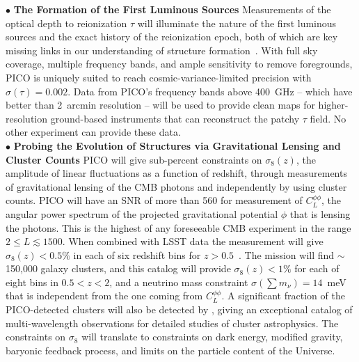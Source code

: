 \documentclass[PICOAPC.tex]{subfiles}
\begin{document}
 
$\bullet$ {\bf The Formation of the First Luminous Sources} \hspace{0.1in} \label{sec:luminoussources}  Measurements of the optical depth to reionization $\tau$ will illuminate the nature of the first luminous sources and the exact history of the reionization epoch, both of which are key missing links in our understanding of structure formation~\citep{alvarez_swp}.  With full sky coverage, multiple frequency bands, and ample sensitivity to remove foregrounds, PICO is uniquely suited to reach cosmic-variance-limited precision with $\sigma(\tau)=0.002$. Data from PICO's frequency bands above 400~GHz -- which have better than 2~arcmin resolution  -- will be used to provide clean maps for higher-resolution ground-based instruments that can reconstruct the patchy $\tau$ field. No other experiment can provide these data. \\
%
$\bullet$ {\bf Probing the Evolution of Structures via Gravitational Lensing and Cluster Counts} \hspace{0.1in} \label{sec:gravitationallensing}   
PICO will give sub-percent constraints on $\sigma_8(z)$, the amplitude of linear fluctuations as a function of redshift, through measurements of gravitational lensing of the CMB photons and independently by using cluster counts. 
PICO will have an \ac{SNR} of more than 560 for measurement of $C_{L}^{\phi \phi}$, the angular power spectrum of the projected gravitational potential $\phi$ that is lensing the photons. This is the highest of any foreseeable CMB experiment in the range $2 \leq L \lesssim 1500$. When combined with LSST data the measurement will give $\sigma_8(z) <0.5\%$ in each of six redshift bins for $z>0.5$~\cite{pico_report}.
The mission will find $\sim$150,000 galaxy clusters, and this catalog will provide $\sigma_{8}(z) < 1\%$ for each of eight bins in $0.5 < z < 2$, and a neutrino mass constraint $\sigma(\sum m_{\nu}) = 14$~meV that is independent from the one coming from $C_{L}^{\phi \phi}$. A significant fraction of the PICO-detected clusters will also be detected by \erosita, giving an exceptional catalog of multi-wavelength observations for detailed studies of cluster astrophysics. The constraints on $\sigma_{8}$ will translate to constraints on dark energy, modified gravity, baryonic feedback process, and limits on the particle content of the Universe. \\
\end{document}
